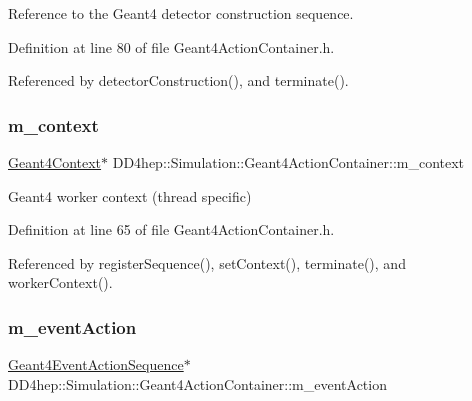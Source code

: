 Reference to the Geant4 detector construction sequence. 



Definition at line 80 of file Geant4\+Action\+Container.\+h.



Referenced by detector\+Construction(), and terminate().

\hypertarget{class_d_d4hep_1_1_simulation_1_1_geant4_action_container_a72ed1f7c3f20c13479de89ebdfd10e77}{}\label{class_d_d4hep_1_1_simulation_1_1_geant4_action_container_a72ed1f7c3f20c13479de89ebdfd10e77} 
\subsubsection{\texorpdfstring{m\+\_\+context}{m\_context}}
{\footnotesize\ttfamily \hyperlink{class_d_d4hep_1_1_simulation_1_1_geant4_context}{Geant4\+Context}$\ast$ D\+D4hep\+::\+Simulation\+::\+Geant4\+Action\+Container\+::m\+\_\+context\hspace{0.3cm}{\ttfamily [protected]}}



Geant4 worker context (thread specific) 



Definition at line 65 of file Geant4\+Action\+Container.\+h.



Referenced by register\+Sequence(), set\+Context(), terminate(), and worker\+Context().

\hypertarget{class_d_d4hep_1_1_simulation_1_1_geant4_action_container_aa97d07df82c52404b5211277bca15a40}{}\label{class_d_d4hep_1_1_simulation_1_1_geant4_action_container_aa97d07df82c52404b5211277bca15a40} 
\subsubsection{\texorpdfstring{m\+\_\+event\+Action}{m\_eventAction}}
{\footnotesize\ttfamily \hyperlink{class_d_d4hep_1_1_simulation_1_1_geant4_event_action_sequence}{Geant4\+Event\+Action\+Sequence}$\ast$ D\+D4hep\+::\+Simulation\+::\+Geant4\+Action\+Container\+::m\+\_\+event\+Action\hspace{0.3cm}{\ttfamily [protected]}}



